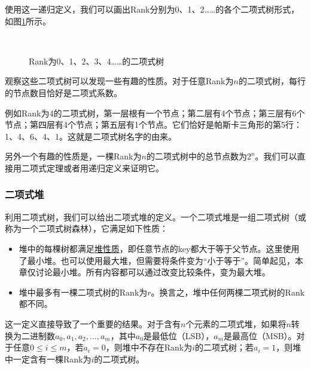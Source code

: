 \documentclass{ctexart}
\begin{document}
使用这一递归定义，我们可以画出Rank分别为0、1、2……的各个二项式树形式，如图\ref{fig:bitree-forms}所示。

\begin{figure}[htbp]
  \centering
   \\
  \caption{Rank为0、1、2、3、4……的二项式树} \label{fig:bitree-forms}
\end{figure}

观察这些二项式树可以发现一些有趣的性质。对于任意Rank为$n$的二项式树，每行的节点数目恰好是二项式系数。

例如Rank为4的二项式树，第一层根有一个节点；第二层有4个节点；第三层有6个节点；第四层有4个节点；第五层有1个节点。它们恰好是帕斯卡三角形的第5行：1、4、6、4、1。这就是二项式树名字的由来。

另外一个有趣的性质是，一棵Rank为$n$的二项式树中的总节点数为$2^n$。我们可以直接用二项式定理或者用递归定义来证明它。

\subsubsection{二项式堆}
\label{Binomial heap} 

利用二项式树，我们可以给出二项式堆的定义。一个二项式堆是一组二项式树（或称为一个二项式树森林），它满足如下性质：

\begin{itemize}
\item 堆中的每棵树都满足\underline{堆性质}，即任意节点的key都大于等于父节点。这里使用了最小堆。也可以使用最大堆，但需要将条件变为“小于等于”。简单起见，本章仅讨论最小堆。所有内容都可以通过改变比较条件，变为最大堆。
\item 堆中最多有一棵二项式树的Rank为$r$。换言之，堆中任何两棵二项式树的Rank都不同。
\end{itemize}

这一定义直接导致了一个重要的结果。对于含有$n$个元素的二项式堆，如果将$n$转换为二进制数$a_0, a_1, a_2, ..., a_m$，其中$a_0$是最低位（LSB），$a_m$是最高位（MSB）。对于任意$0 \leq i \leq m$，若$a_i=0$，则堆中不存在Rank为$i$的二项式树；若$a_i = 1$，则堆中一定含有一棵Rank为$i$的二项式树。
\end{document}
